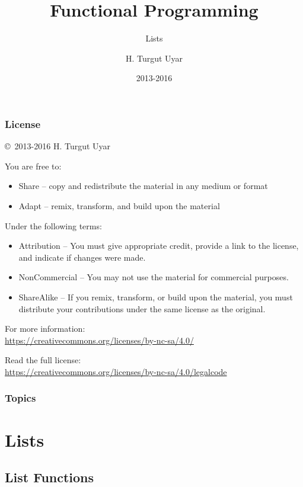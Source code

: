\documentclass[dvipsnames]{beamer}
\title{Functional Programming}
\subtitle{Lists}
\author{H. Turgut Uyar}
\date{2013-2016}
\theoremstyle{plain}
\begin{document}
\begin{frame}
  \titlepage
\end{frame}

\begin{frame}
  \frametitle{License}

  \hfill
  \copyright~2013-2016 H. Turgut Uyar

  \vfill
  \begin{footnotesize}
    You are free to:
    \begin{itemize}
      \itemsep0em
      \item Share -- copy and redistribute the material in any medium or format
      \item Adapt -- remix, transform, and build upon the material
    \end{itemize}

    Under the following terms:
    \begin{itemize}
      \itemsep0em
      \item Attribution -- You must give appropriate credit, provide a link to
        the license, and indicate if changes were made.

      \item NonCommercial -- You may not use the material for commercial
        purposes.

      \item ShareAlike -- If you remix, transform, or build upon the material,
        you must distribute your contributions under the same license as the
        original.
    \end{itemize}

    For more information:\\
    \url{https://creativecommons.org/licenses/by-nc-sa/4.0/}

    \smallskip
    Read the full license:\\
    \url{https://creativecommons.org/licenses/by-nc-sa/4.0/legalcode}
  \end{footnotesize}
\end{frame}

\begin{frame}
  \frametitle{Topics}
  \tableofcontents
\end{frame}

\section{Lists}

\subsection{List Functions}
\end{document}

